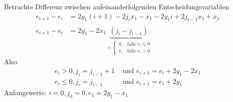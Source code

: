 Betrachte Differenz zwischen aufeinanderfolgenden Entscheidungsvariablen
\begin{align*}
 e_{i+1} - e_i &= \underline{2y_1(i+1)} - 2 j_i x_1 - \underline{x_1} - \underline{2y_1}i + 2j_{i-1}x_1
			+ \underline{x_1}\\
 e_{i+1} - e_i &= 2 y_1 - 2 x_1 \underbrace{(j_i - j_{i-1})}_{= \begin{cases}
                                                                 0, &\text{falls $e_i \le 0$}\\
								 1, & \text{falls $e_i > 0$}
                                                                \end{cases}
								}
\end{align*}
Also
\begin{align*}
 e_i > 0, j_i = j_{i-1} + 1 &\text{ und } e_{i+1} = e_i + 2y_1 - 2x_1 \\
 e_i \le 0, j_i = j_{i-1} &\text{ und } e_{i+1} = e_i + 2y_1
\end{align*}
Anfangswerte: $i=0, j_0 = 0,  e_1 = 2y_1 - x_1$

\pagebreak
